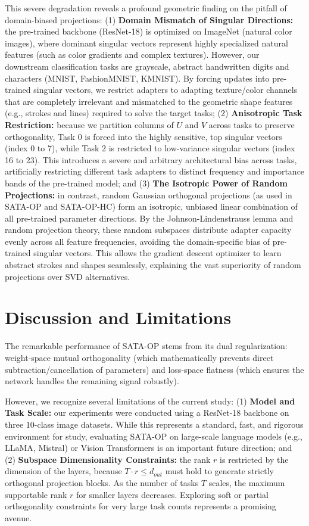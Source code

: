 \documentclass{article}
\theoremstyle{plain}
\theoremstyle{definition}
\theoremstyle{remark}
\begin{document}
This severe degradation reveals a profound geometric finding on the pitfall of domain-biased projections: (1) \textbf{Domain Mismatch of Singular Directions:} the pre-trained backbone (ResNet-18) is optimized on ImageNet (natural color images), where dominant singular vectors represent highly specialized natural features (such as color gradients and complex textures). However, our downstream classification tasks are grayscale, abstract handwritten digits and characters (MNIST, FashionMNIST, KMNIST). By forcing updates into pre-trained singular vectors, we restrict adapters to adapting texture/color channels that are completely irrelevant and mismatched to the geometric shape features (e.g., strokes and lines) required to solve the target tasks; (2) \textbf{Anisotropic Task Restriction:} because we partition columns of $U$ and $V$ across tasks to preserve orthogonality, Task 0 is forced into the highly sensitive, top singular vectors (index 0 to 7), while Task 2 is restricted to low-variance singular vectors (index 16 to 23). This introduces a severe and arbitrary architectural bias across tasks, artificially restricting different task adapters to distinct frequency and importance bands of the pre-trained model; and (3) \textbf{The Isotropic Power of Random Projections:} in contrast, random Gaussian orthogonal projections (as used in SATA-OP and SATA-OP-HC) form an isotropic, unbiased linear combination of all pre-trained parameter directions. By the Johnson-Lindenstrauss lemma and random projection theory, these random subspaces distribute adapter capacity evenly across all feature frequencies, avoiding the domain-specific bias of pre-trained singular vectors. This allows the gradient descent optimizer to learn abstract strokes and shapes seamlessly, explaining the vast superiority of random projections over SVD alternatives.

\section{Discussion and Limitations}
\label{sec:discussion}

The remarkable performance of SATA-OP stems from its dual regularization: weight-space mutual orthogonality (which mathematically prevents direct subtraction/cancellation of parameters) and loss-space flatness (which ensures the network handles the remaining signal robustly). 

However, we recognize several limitations of the current study: (1) \textbf{Model and Task Scale:} our experiments were conducted using a ResNet-18 backbone on three 10-class image datasets. While this represents a standard, fast, and rigorous environment for study, evaluating SATA-OP on large-scale language models (e.g., LLaMA, Mistral) or Vision Transformers is an important future direction; and (2) \textbf{Subspace Dimensionality Constraints:} the rank $r$ is restricted by the dimension of the layers, because $T \cdot r \le d_{out}$ must hold to generate strictly orthogonal projection blocks. As the number of tasks $T$ scales, the maximum supportable rank $r$ for smaller layers decreases. Exploring soft or partial orthogonality constraints for very large task counts represents a promising avenue.
\end{document}
